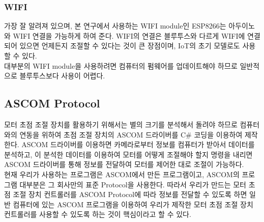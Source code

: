 \subsubsection{WIFI}

가장 잘 알려져 있으며, 본 연구에서 사용하는 WIFI module인 ESP8266는 아두이노와 WIFI 연결을 가능하게 하여 준다. WIFI의 연결은 블루투스와 다르게 WIFI에 연결되어 있으면 언제든지 조절할 수 있다는 것이 큰 장점이며, IoT의 초기 모델로도 사용할 수 있다.\\
대부분의 WIFI module을 사용하려면 컴퓨터의 펌웨어를 업데이트해야 하므로 일반적으로 블루투스보다 사용이 어렵다. 

\subsection{ASCOM Protocol}

모터 초점 조절 장치를 활용하기 위해서는 별의 크기를 분석해서 돌려야 하므로 컴퓨터와의 연동을 위하여 초점 조절 장치의 ASCOM 드라이버를 C\# 코딩을 이용하여 제작한다. ASCOM 드라이버를 이용하면 카메라로부터 정보를 컴퓨터가 받아서 데이터를 분석하고, 이 분석한 데이터를 이용하여 모터를 어떻게 조절해야 할지 명령을 내리면 ASCOM 드라이버를 통해 정보를 전달하여 모터를 제어한 대로 조절이 가능하다.\\
현재 우리가 사용하는 프로그램은 ASCOM에서 만든 프로그램이고, ASCOM의 프로그램 대부분은 그 회사만의 표준 Protocol을 사용한다. 따라서 우리가 만드는 모터 초점 조절 장치 컨트롤러를 ASCOM Protocol에 따라 정보를 전달할 수 있도록 하면 일반 컴퓨터에 있는 ASCOM 프로그램을 이용하여 우리가 제작한 모터 초점 조절 장치 컨트롤러를 사용할 수 있도록 하는 것이 핵심이라고 할 수 있다.